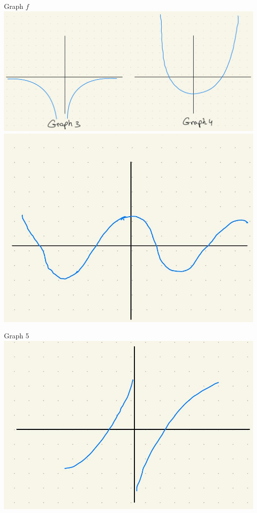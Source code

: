 \documentclass[10pt]{article}
\begin{document}
Graph $f$\\
\includegraphics[max width=\textwidth, center]{2024_12_26_646789e1ccd1e87aeca8g-08(1)}\\
\includegraphics[max width=\textwidth, center]{2024_12_26_646789e1ccd1e87aeca8g-09(1)}

Graph 5\\
\includegraphics[max width=\textwidth, center]{2024_12_26_646789e1ccd1e87aeca8g-09(2)}
\end{document}
